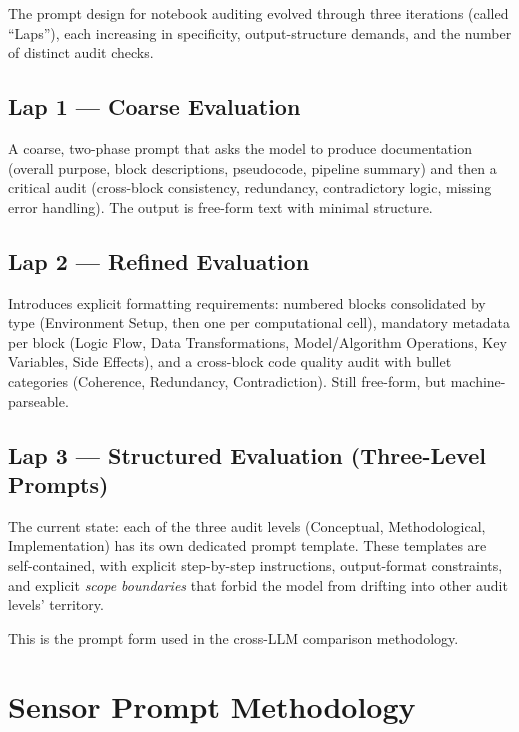 \documentclass[11pt, a4paper]{article}
\begin{document}
The prompt design for notebook auditing evolved through three iterations
(called ``Laps''), each increasing in specificity, output-structure demands,
and the number of distinct audit checks.

\subsection{Lap 1 — Coarse Evaluation}

A coarse, two-phase prompt that asks the model to produce documentation
(overall purpose, block descriptions, pseudocode, pipeline summary) and then
a critical audit (cross-block consistency, redundancy, contradictory logic,
missing error handling). The output is free-form text with minimal structure.

\subsection{Lap 2 — Refined Evaluation}

Introduces explicit formatting requirements: numbered blocks consolidated by
type (Environment Setup, then one per computational cell), mandatory metadata
per block (Logic Flow, Data Transformations, Model/Algorithm Operations, Key
Variables, Side Effects), and a cross-block code quality audit with bullet
categories (Coherence, Redundancy, Contradiction). Still free-form, but
machine-parseable.

\subsection{Lap 3 — Structured Evaluation (Three-Level Prompts)}

The current state: each of the three audit levels (Conceptual, Methodological,
Implementation) has its own dedicated prompt template. These templates are
self-contained, with explicit step-by-step instructions, output-format
constraints, and explicit \emph{scope boundaries} that forbid the model from
drifting into other audit levels' territory.

This is the prompt form used in the cross-LLM comparison methodology.

\section{Sensor Prompt Methodology}
\end{document}
